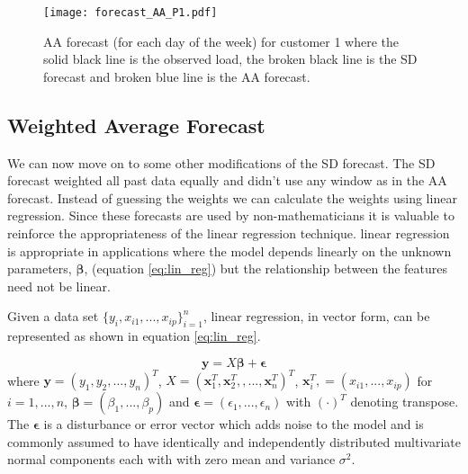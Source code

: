 \begin{figure}
\centering
\texttt{[image: forecast\_AA\_P1.pdf]}
\caption{AA forecast (for each day of the week) for customer 1 where the solid black line is the observed load, the broken black line is the SD forecast and broken blue line is the AA forecast.}
\label{fig:AA_forecast_P1} 
\end{figure}

\subsection{Weighted Average Forecast}

We can now move on to some other modifications of the SD forecast. The SD forecast weighted all past data equally and didn't use any window as in the AA forecast. Instead of guessing the weights we can calculate the weights using linear regression. Since these forecasts are used by non-mathematicians it is valuable to reinforce the appropriateness of the linear regression technique.  linear regression is appropriate in applications where the model depends linearly on the unknown parameters, $\boldsymbol \beta$, (equation \ref{eq:lin_reg}) but the relationship between the features need not be linear.

Given a data set $\{y_i, x_{i1}, ... , x_{ip}\}_{i=1}^n$, linear regression, in vector form, can be represented as shown in equation \ref{eq:lin_reg}.

\begin{equation} \label{eq:lin_reg}
\textbf{y} = X \boldsymbol \beta +\boldsymbol \epsilon
\end{equation}
where $\textbf{y} = (y_1, y_2, ... , y_n)^T $, $X =  (\textbf{x}_1^T, \textbf{x}_2^T,, ... ,\textbf{x}_n^T)^T$,  $\textbf{x}_i^T, = (x_{i1}, ... , x_{ip})$ for $i = 1, ... , n$, $\boldsymbol \beta = (\beta_1 , ... , \beta_p)$ and $\boldsymbol \epsilon = (\epsilon_1, ... , \epsilon_n)$ with $( \cdot )^T$ denoting transpose. The $\boldsymbol \epsilon$ is a disturbance or error vector which adds noise to the model and is commonly assumed to have identically and independently distributed multivariate normal components each with with zero mean and variance $\sigma^2$.

